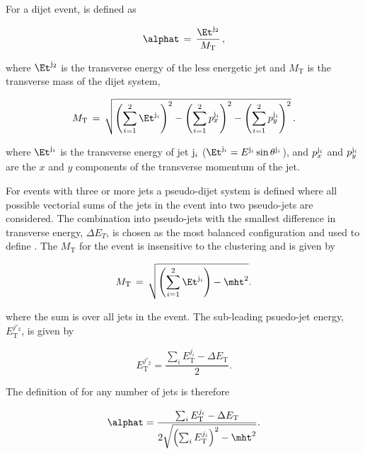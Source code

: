 For a dijet event, \alphat is defined as

\begin{equation}
\label{eq:alphat}
\alphat\, =\, \frac{\Et^{{\rm j}_2}}{M_\text{T}} \, ,
\end{equation}

where $\Et^{\rm j_2}$ is the transverse energy of the 
less energetic jet and $M_\text{T}$ is the transverse
mass of the dijet system, 

\begin{equation}
  \label{eq:mt}
  M_\text{T}\, = \,\sqrt{ \left( \sum_{i=1}^2 \Et^{{\rm j}_i}
    \right)^2 - \left( \sum_{i=1}^2 p_x^{{\rm j}_i} \right)^2 - \left(
      \sum_{i=1}^2 p_y^{{\rm j}_i} \right)^2} \, .
\end{equation}

where $\Et^{{\rm j}_i}$ is the transverse energy of jet ${\rm j}_i$ 
($\Et^{{\rm j}_i} = E^{{\rm j}_i}\sin\theta^{{\rm j}_i}$), and
$p_x^{{\rm j}_i}$ and $p_y^{{\rm j}_i}$ are the $x$ and $y$ components
of the transverse momentum of the jet. 

For events with three or more jets a pseudo-dijet system is defined 
where all possible vectorial sums of the jets in the event into two
pseudo-jets are considered. The combination into pseudo-jets 
with the smallest difference in transverse energy, $\Delta E_T$, is chosen
as the most balanced configuration and used to define \alphat. The $M_\text{T}$ for 
the event is insensitive to the clustering and is given by

\begin{equation}
  \label{eq:mt_njet}
  M_\text{T}\, = \,\sqrt{ \left( \sum_{i=1}^2 \Et^{{\rm{j}}_i}
    \right) - \mht^2}.
\end{equation}

where the sum is over all jets in the event. The sub-leading psuedo-jet energy, 
$E_{\textrm{T}}^{j'_2}$, is given by

\begin{equation}
E_{\textrm{T}}^{j'_2} = \frac{\sum_{i} E_{\textrm{T}}^{j_i} - \Delta E_{\textrm{T}}}{2}.
\end{equation}

The definition of \alphat for any number of jets is therefore

\begin{equation}
  \label{eq:alphat2}
   \alphat = \frac{\sum_{i} E_{\textrm{T}}^{j_i} - \Delta E_{\textrm{T}}}{2\sqrt{\left(\sum_{i} E_{\textrm{T}}^{j_i}\right)^2 - \mht^2}}.
\end{equation}

